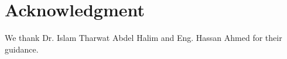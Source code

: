 \documentclass[conference, 10pt]{IEEEtran}
\begin{document}


\section*{Acknowledgment} 
We thank Dr. Islam Tharwat Abdel Halim and Eng. Hassan Ahmed for their guidance.


 
\end{document}
